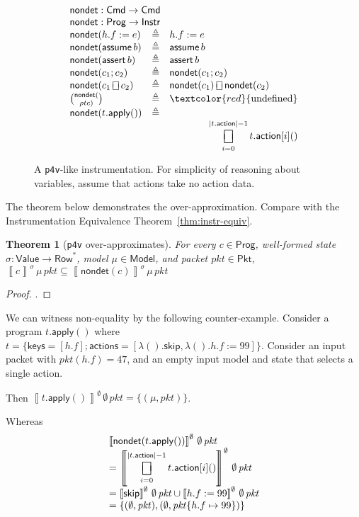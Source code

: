 \documentclass{article}
\newcommand{\pkt}{\mathit{pkt}}
\newcommand{\denote}[1]{\left\llbracket#1\right\rrbracket}
\newcommand{\Value}{\mathsf{Value}}
\newcommand{\Cmd}{\mathsf{Cmd}}
\newcommand{\Instr}{\mathsf{Instr}}
\newcommand{\Prog}{\mathsf{Prog}}
\newcommand{\Pkt}{\mathsf{Pkt}}
\newcommand{\Model}{\mathsf{Model}}
\newcommand{\Row}{\mathsf{Row}}
\newcommand{\action}{\mathsf{action}}
\newcommand{\actions}{\mathsf{actions}}
\newcommand{\keys}{\mathsf{keys}}
\newcommand{\assert}{\mathop{\mathsf{assert}}}
\newcommand{\assume}{\mathop{\mathsf{assume}}}
\newcommand{\apply}{\mathsf{apply}}
\newcommand{\choiceop}{\rotatebox[origin=c]{90}{$\sqsubset\!\!\!\sqsupset$}}
\newcommand{\choice}{\mathbin{\choiceop}}
\DeclareMathOperator*{\bigchoice}{\scalerel*{\choiceop}{\sum}}
\newcommand{\SKIP}{\mathsf{skip}}
\newcommand{\nondet}{\mathsf{nondet}}
\newtheorem{theorem}{Theorem}
\begin{document}
\begin{figure}
  \[\begin{array}{l >{\triangleq}cl}
  \multicolumn{3}{l}{\nondet : \Cmd \to \Cmd} \\
  \multicolumn{3}{l}{\nondet : \Prog \to \Instr} \\
  \nondet(h.f := e) && h.f := e \\
  \nondet(\assume b) && \assume b \\
  \nondet(\assert b) && \assert b \\
  \nondet(c_1;c_2) && \nondet(c_1;c_2) \\
  \nondet(c_1 \choice c_2) && \nondet(c_1) \choice \nondet(c_2) \\
  \nondet(\choose \rho t c) && \textcolor{red}{\text{undefined}} \\
  \nondet(t.\apply()) && \\
  \multicolumn{3}{>{\qquad}r}{
    \displaystyle
    \bigchoice_{i = 0}^{|t.\action|-1}t.\action[i]()
  }
  \end{array}\]
  \caption{A \texttt{p4v}-like instrumentation. For simplicity of reasoning
    about variables, assume that actions take no action data. }
  \label{fig:p4vlike}
\end{figure}

The theorem below demonstrates the over-approximation. Compare with the Instrumentation Equivalence Theorem~\ref{thm:instr-equiv}.

\begin{theorem}[\texttt{p4v} over-approximates]
  \label{thm:p4v-over}
  For every $c \in \Prog$, well-formed state $\sigma : \Value \to \Row^* $,
  model $\mu \in \Model$, and packet $\pkt \in \Pkt$,
  $\denote{c}^\sigma\,\mu\,\pkt \subseteq \denote{\nondet(c)}^\sigma\,\mu\,\pkt$
\end{theorem}

\begin{proof}
.
\end{proof}

We can witness non-equality by the following counter-example. Consider a program
$t.\apply()$ where $t = \{\keys=[h.f];\actions=[\lambda().\SKIP, \lambda(). h.f :=
  99]\}$. Consider an input packet with $\pkt(h.f) = 47$, and an empty input
model and state that selects a single action.

Then $\denote{t.\apply()}^\emptyset\,\emptyset\,\pkt = \{(\mu,\pkt)\}$.

Whereas
\[\begin{array}{l}
\denote{\nondet(t.\apply())}^\emptyset\,\emptyset\,\pkt \\
= \denote{
    \displaystyle
    \bigchoice_{i = 0}^{|t.\action|-1} t.\action[i]()
}^\emptyset\,\emptyset\,\pkt \\
= \denote{\SKIP}^\emptyset\,\emptyset\,\pkt \cup \denote{h.f := 99}^\emptyset\,\emptyset\,\pkt\\
= \{(\emptyset,\pkt),(\emptyset,\pkt\{h.f\mapsto 99\})\}
\end{array}\]
\end{document}
